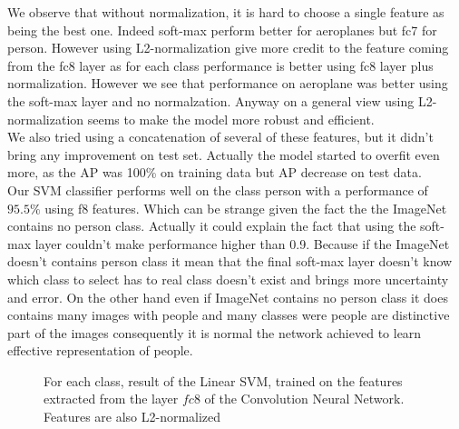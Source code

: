 \documentclass[a4paper,11pt]{exam}
\begin{document}
We observe that without normalization, it is hard to choose a single feature as being the best one. Indeed soft-max perform better for aeroplanes but fc7 for person. However using L2-normalization give more credit to the feature coming from the fc8 layer as for each class performance is better using fc8 layer plus normalization. However we see that performance on aeroplane was better using the soft-max layer and no normalzation. Anyway on a general view using L2-normalization seems to make the model more robust and efficient.\\

We also tried using a concatenation of several of these features, but it didn't bring any improvement on test set. Actually the model started to overfit even more, as the AP was 100\% on training data but AP decrease on test data.\\

Our SVM classifier performs well on the class person with a performance of $95.5\%$ using f8 features. Which can be strange given the fact the the ImageNet contains no person class. Actually it could explain the fact that using the soft-max layer couldn't make performance higher than 0.9. Because if the ImageNet doesn't contains person class it mean that the final soft-max layer doesn't know which class to select has to real class doesn't exist and brings more uncertainty and error. On the other hand even if ImageNet contains no person class it does contains many images with people and many classes were people are distinctive part of the images consequently it is normal the network achieved to learn effective representation of people.\\


\begin{figure}[!h]%
    \centering
    \qquad
    \qquad
    \qquad
    \qquad
    \qquad
    \qquad
    \caption{For each class, result of the Linear SVM, trained on the features extracted from the layer $fc8$ of the Convolution Neural Network. Features are also L2-normalized}%
    \label{cnn}%
\end{figure}
\end{document}
